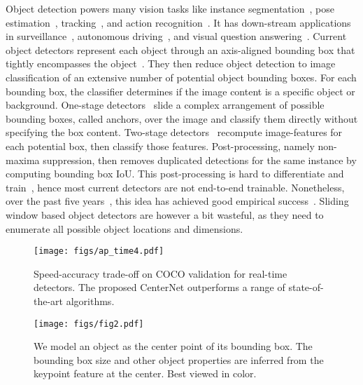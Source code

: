 \documentclass[10pt,twocolumn,letterpaper]{article}
\begin{document}
Object detection powers many vision tasks like instance segmentation~\cite{he2017mask,li2017fully,chen2018deeplab}, pose estimation~\cite{cao2018openpose,fang2017rmpe,newell2017associative}, tracking~\cite{kalal2012tracking,hu2018joint}, and action recognition~\cite{carreira2017quo}.
It has down-stream applications in surveillance~\cite{xu2018attention}, autonomous driving~\cite{wang2018deep}, and visual question answering~\cite{antol2015vqa}.
Current object detectors represent each object through an axis-aligned bounding box that tightly encompasses the object~\cite{girshick2014rich,girshick2015fast,ren2015faster,redmon2016you,lin2018focal}.
They then reduce object detection to image classification of an extensive number of potential object bounding boxes.
For each bounding box, the classifier determines if the image content is a specific object or background.
One-stage detectors~\cite{redmon2016you,lin2018focal} slide a complex arrangement of possible bounding boxes, called anchors, over the image and classify them directly without specifying the box content.
Two-stage detectors~\cite{girshick2014rich,girshick2015fast,ren2015faster} recompute image-features for each potential box, then classify those features.
Post-processing, namely non-maxima suppression, then removes duplicated detections for the same instance by computing bounding box IoU.
This post-processing is hard to differentiate and train~\cite{hosang2017learning}, hence most current detectors are not end-to-end trainable.
Nonetheless, over the past five years~\cite{girshick2014rich}, this idea has achieved good empirical success~\cite{he2017mask,xie2017aggregated,Dai_2017_ICCV,singh2018analysis,huang2017speed,Jiang_2018_ECCV,liu2018path,zhu2018deformable,sniper2018,li2019scale,zhu2019feature}.
Sliding window based object detectors are however a bit wasteful, as they need to enumerate all possible object locations and dimensions.

\begin{figure}[t]
\centering
\vspace{-1em}
   \texttt{[image: figs/ap\_time4.pdf]}
   \vspace{-1em}
   \caption{Speed-accuracy trade-off on COCO validation for real-time detectors. The proposed CenterNet outperforms a range of state-of-the-art algorithms.}
   \vspace{-1em}
\label{fig:tradeoff}
\label{fig:onecol}
\end{figure}




\begin{figure*}[t]
\centering
   \texttt{[image: figs/fig2.pdf]}
\vspace{-1mm}
   \caption{We model an object as the center point of its bounding box. The bounding box size and other object properties are inferred from the keypoint feature at the center. Best viewed in color.}
   \vspace{-1.0em}
\label{fig:teaser}
\end{figure*}
\end{document}
